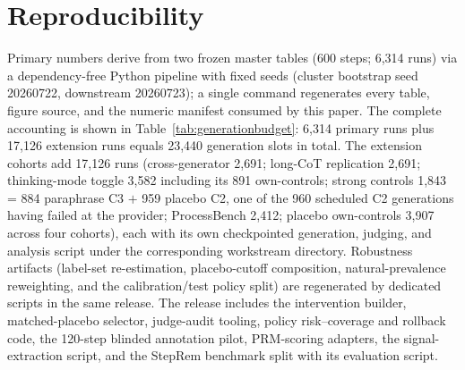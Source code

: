 \documentclass[11pt]{article}
\begin{document}
\section{Reproducibility}
\label{app:repro}

Primary numbers derive from two frozen master tables (600 steps; 6{,}314 runs) via a dependency-free Python pipeline with fixed seeds (cluster bootstrap seed 20260722, downstream 20260723); a single command regenerates every table, figure source, and the numeric manifest consumed by this paper. The complete accounting is shown in Table~\ref{tab:generationbudget}: 6{,}314 primary runs plus 17{,}126 extension runs equals 23{,}440 generation slots in total. The extension cohorts add 17{,}126 runs (cross-generator 2{,}691; long-CoT replication 2{,}691; thinking-mode toggle 3{,}582 including its 891 own-controls; strong controls 1{,}843 = 884 paraphrase C3 $+$ 959 placebo C2, one of the 960 scheduled C2 generations having failed at the provider; ProcessBench 2{,}412; placebo own-controls 3{,}907 across four cohorts), each with its own checkpointed generation, judging, and analysis script under the corresponding workstream directory. Robustness artifacts (label-set re-estimation, placebo-cutoff composition, natural-prevalence reweighting, and the calibration/test policy split) are regenerated by dedicated scripts in the same release. The release includes the intervention builder, matched-placebo selector, judge-audit tooling, policy risk--coverage and rollback code, the 120-step blinded annotation pilot, PRM-scoring adapters, the signal-extraction script, and the StepRem benchmark split with its evaluation script.
\end{document}
